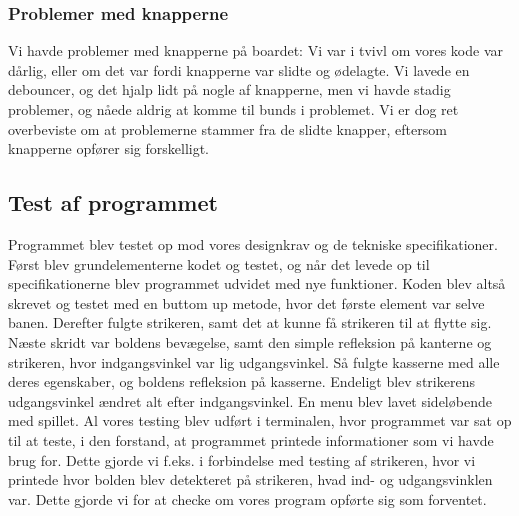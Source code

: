 \subsubsection{Problemer med knapperne}
Vi havde problemer med knapperne på boardet: Vi var i tvivl om vores kode var dårlig, eller om det var fordi knapperne var slidte og ødelagte. Vi lavede en debouncer, og det hjalp lidt på nogle af knapperne, men vi havde stadig problemer, og nåede aldrig at komme til bunds i problemet. Vi er dog ret overbeviste om at problemerne stammer fra de slidte knapper, eftersom knapperne opfører sig forskelligt.
\subsection{Test af programmet}
Programmet blev testet op mod vores designkrav og de tekniske specifikationer. Først blev grundelementerne kodet og testet, og når det levede op til specifikationerne blev programmet udvidet med nye funktioner. Koden blev altså skrevet og testet med en buttom up metode, hvor det første element var selve banen. Derefter fulgte strikeren, samt det at kunne få strikeren til at flytte sig. Næste skridt var boldens bevægelse, samt den simple refleksion på kanterne og strikeren, hvor indgangsvinkel var lig udgangsvinkel. Så fulgte kasserne med alle deres egenskaber, og boldens refleksion på kasserne. Endeligt blev strikerens udgangsvinkel ændret alt efter indgangsvinkel. En menu blev lavet sideløbende med spillet. 
Al vores testing blev udført i terminalen, hvor programmet var sat op til at teste, i den forstand, at programmet printede informationer som vi havde  brug for. Dette gjorde vi f.eks. i forbindelse med testing af strikeren, hvor vi printede hvor bolden blev detekteret på strikeren, hvad ind- og udgangsvinklen var. Dette gjorde vi for at checke om vores program opførte sig som forventet.


